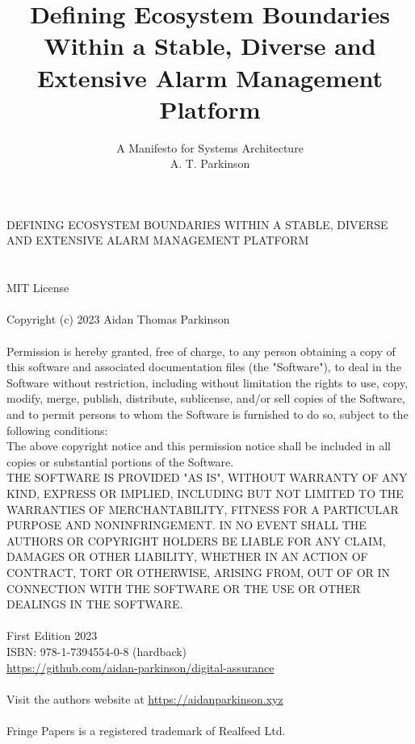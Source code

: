 \documentclass[11pt, oneside]{article}   	%
\title{Defining Ecosystem Boundaries Within a Stable, Diverse and Extensive Alarm Management Platform}
\author{\Large A Manifesto for Systems Architecture\\
\large A. T. Parkinson}
\date{}						%
\begin{document}

\begin{center}
\vspace*{50mm}
DEFINING ECOSYSTEM BOUNDARIES WITHIN A STABLE, DIVERSE AND EXTENSIVE ALARM MANAGEMENT PLATFORM
\end{center}

\pagebreak

\section*{}
\begin{small}
	MIT License\\
	\\
	Copyright (c) 2023 Aidan Thomas Parkinson\\
	\\
	Permission is hereby granted, free of charge, to any person obtaining a copy of this software and associated documentation files (the "Software"), to deal in the Software without restriction, including without limitation the rights to use, copy, modify, merge, publish, distribute, sublicense, and/or sell copies of the Software, and to permit persons to whom the Software is furnished to do so, subject to the following conditions:\\
	The above copyright notice and this permission notice shall be included in all copies or substantial portions of the Software.\\
	THE SOFTWARE IS PROVIDED "AS IS", WITHOUT WARRANTY OF ANY KIND, EXPRESS OR IMPLIED, INCLUDING BUT NOT LIMITED TO THE WARRANTIES OF MERCHANTABILITY, FITNESS FOR A PARTICULAR PURPOSE AND NONINFRINGEMENT. IN NO EVENT SHALL THE AUTHORS OR COPYRIGHT HOLDERS BE LIABLE FOR ANY CLAIM, DAMAGES OR OTHER LIABILITY, WHETHER IN AN ACTION OF CONTRACT, TORT OR OTHERWISE, ARISING FROM, OUT OF OR IN CONNECTION WITH THE SOFTWARE OR THE USE OR OTHER DEALINGS IN THE SOFTWARE.\\
	\\
	First Edition 2023\\
	ISBN: 978-1-7394554-0-8 (hardback)\\
	\url{https://github.com/aidan-parkinson/digital-assurance}\\
	\\
	Visit the authors website at \url{https://aidanparkinson.xyz}\\
	\\
	Fringe Papers is a registered trademark of Realfeed Ltd.
\end{small}
\end{document}
